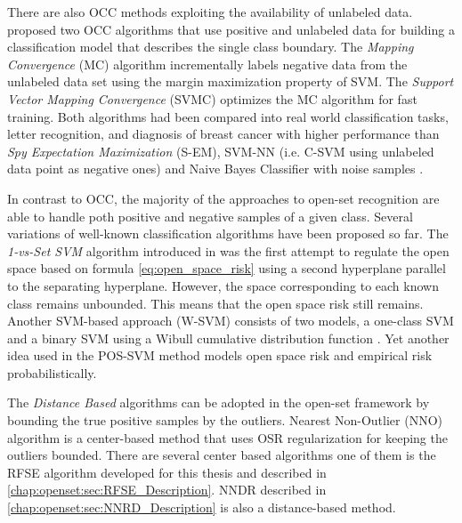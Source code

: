 There are also OCC methods exploiting the availability of unlabeled data. \parencite{yu2005single} proposed two OCC algorithms that use positive and unlabeled data for building a classification model that describes the single class boundary. The \textit{Mapping Convergence} (MC) algorithm incrementally labels negative data from the unlabeled data set using the margin maximization property of SVM. The \textit{Support Vector Mapping Convergence} (SVMC) optimizes the MC algorithm for fast training. Both algorithms had been compared into real world  classification tasks, letter recognition, and diagnosis of breast cancer with higher performance than \textit{Spy Expectation Maximization} (S-EM), SVM-NN (i.e. C-SVM using unlabeled data point as negative ones) and Naive Bayes Classifier with noise samples \parencite{liu2002partially, li2003learning}.

In contrast to OCC, the majority of the approaches to open-set recognition are able to handle poth positive and negative samples of a given class. Several variations of well-known classification algorithms have been proposed so far. The \textit{1-vs-Set SVM} algorithm introduced in \parencite{scheirer2013toward} was the first attempt to regulate the open space based on formula \ref{eq:open_space_risk} using a second hyperplane parallel to the separating hyperplane. However, the space corresponding to each known class remains unbounded. This means that the open space risk still remains. Another SVM-based approach (W-SVM) consists of two models, a one-class SVM and a binary SVM using a Wibull cumulative distribution function \parencite{scheirer2014probability}. Yet another idea used in the POS-SVM method \parencite{scherreik2016open} models open space risk and empirical risk probabilistically. 

The \textit{Distance Based} algorithms can be adopted in the open-set framework by bounding the true positive samples by the outliers. Nearest Non-Outlier (NNO) algorithm is a center-based method that uses OSR regularization for keeping the outliers bounded. There are several center based algorithms one of them is the RFSE algorithm developed for this thesis and described in \ref{chap:openset:sec:RFSE_Description}. NNDR described in \ref{chap:openset:sec:NNRD_Description} is also a distance-based method.


